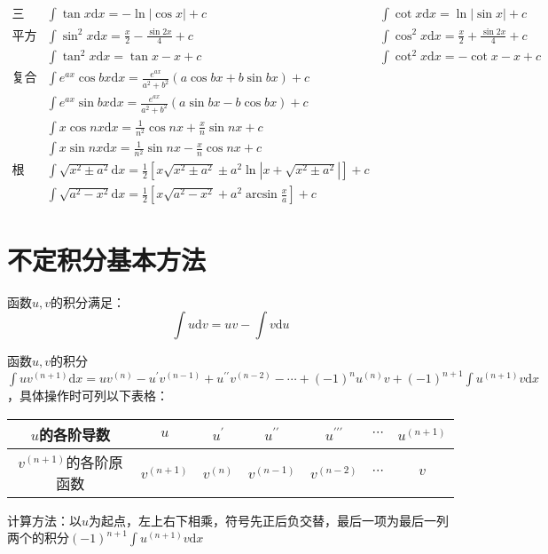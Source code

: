 \begin{equation*}
  \begin{array}{lll}
    \text{三角：}& \int \tan x \mathrm{d}x = -\ln |\cos x| + c & \int \cot x \mathrm{d}x = \ln |\sin x| + c\\
    \text{平方三角：}& \int \sin^2 x \mathrm{d}x = \frac{x}{2} - \frac{\sin 2x}{4} + c& \int \cos^2 x \mathrm{d}x = \frac{x}{2} + \frac{\sin 2x}{4} + c\\
                 & \int \tan^2 x \mathrm{d}x = \tan x - x + c & \int \cot^2 x \mathrm{d}x = -\cot x - x + c\\
    \text{复合三角：}& \int e^{ax} \cos bx \mathrm{d} x = \frac{e^{ax}}{a^2 + b^2}(a \cos bx + b \sin bx) + c&\\
                 & \int e^{ax} \sin bx \mathrm{d} x = \frac{e^{ax}}{a^2 + b^2} (a \sin bx - b \cos bx) + c&\\
                 & \int x \cos nx \mathrm{d} x = \frac{1}{n^2} \cos nx + \frac{x}{n} \sin nx + c&\\
                 & \int x \sin nx \mathrm{d} x = \frac{1}{n^2} \sin nx - \frac{x}{n} \cos nx + c&\\
    \text{根式：}&\int \sqrt{x^2 \pm a^2}\mathrm{d} x = \frac{1}{2} \left[ x \sqrt{x^2 \pm a^2} \pm a^2 \ln|x + \sqrt{x^2 \pm a^2}| \right] + c&\\
                 &\int \sqrt{a^2 - x^2}\mathrm{d} x = \frac{1}{2} \left[ x \sqrt{a^2 - x^2} + a^2 \arcsin \frac{x}{a}  \right] + c&
  \end{array}
\end{equation*}



\section{不定积分基本方法}

\begin{theorem}[分部积分公式]
  函数$u,v$的积分满足：
  \begin{equation*}
    \int u \mathrm{d} v = uv - \int v \mathrm{d} u
  \end{equation*}
\end{theorem}

\begin{theorem}[表格法]
  函数$u,v$的积分$\int uv^{(n+1)} \mathrm{d} x = uv^{(n)} - u^{\prime}v^{(n-1)} + u^{\prime\prime}v^{(n-2)}- \cdots + (-1)^n u^{(n)}v +(-1)^{n+1}\int u^{(n+1)} v\mathrm{d}x$，具体操作时可列以下表格：
  \begin{center}
    \begin{tabular}[htp]{|c|c|c|c|c|c|c|}
      \hline
      $u$的各阶导数&$u$&$u^{\prime}$&$u^{\prime\prime}$&$u^{\prime\prime\prime}$&$\cdots$&$u^{(n+1)}$\\
      \hline
      $v^{(n+1)}$的各阶原函数&$v^{(n+1)}$&$v^{(n)}$&$v^{(n-1)}$&$v^{(n-2)}$&$\cdots$&$v$\\
      \hline
    \end{tabular}
  \end{center}
  计算方法：以$u$为起点，左上右下相乘，符号先正后负交替，最后一项为最后一列两个的积分$(-1)^{n+1}\int u^{(n+1)}v \mathrm{d} x$
\end{theorem}

